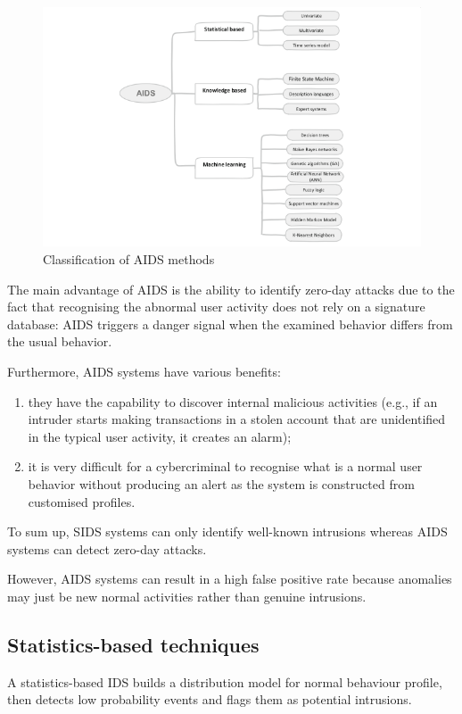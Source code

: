 \begin{figure}[H]
\centering
\includegraphics{Resources/AIDS.png}
\caption{Classification of AIDS methods}
\label{fig:AIDS}
\end{figure}

The main advantage of AIDS is the ability to identify zero-day attacks due to the fact that recognising the abnormal user activity does not rely on a signature database: AIDS triggers a danger signal when the examined behavior differs from the usual behavior.

Furthermore, AIDS systems have various benefits:
\begin{enumerate}
    \item they have the capability to discover internal malicious activities (e.g., if an intruder starts making transactions in a stolen account that are unidentified in the typical user activity, it creates an alarm);
    \item it is very difficult for a cybercriminal to recognise what is a normal user behavior without producing an alert as the system is constructed from customised profiles.
\end{enumerate}

To sum up, SIDS systems can only identify well-known intrusions whereas AIDS systems can detect zero-day attacks.

However, AIDS systems can result in a high false positive rate because anomalies may just be new normal activities rather than genuine intrusions.

\subsection{Statistics-based techniques}
A statistics-based IDS builds a distribution model for normal behaviour profile, then detects low probability events and flags them as potential intrusions.

